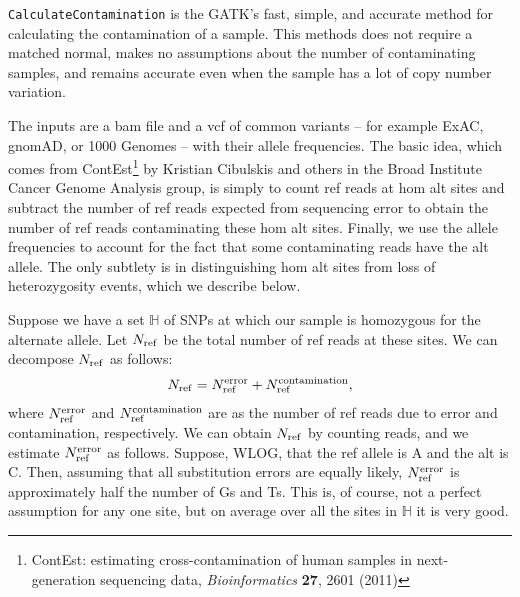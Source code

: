 \documentclass[nofootinbib,amssymb,amsmath]{revtex4}
\newcommand{\code}[1]{\texttt{#1}}
\begin{document}
\code{CalculateContamination} is the GATK's fast, simple, and accurate method for calculating the contamination of a sample.  This methods does not require a matched normal, makes no assumptions about the number of contaminating samples, and remains accurate even when the sample has a lot of copy number variation.

The inputs are a bam file and a vcf of common variants -- for example ExAC, gnomAD, or 1000 Genomes -- with their allele frequencies.  The basic idea, which comes from ContEst\footnote{ContEst: estimating cross-contamination of human samples in next-generation sequencing data, \textit{Bioinformatics} \textbf{27}, 2601 (2011)} by Kristian Cibulskis and others in the Broad Institute Cancer Genome Analysis group, is simply to count ref reads at hom alt sites and subtract the number of ref reads expected from sequencing error to obtain the number of ref reads contaminating these hom alt sites.  Finally, we use the allele frequencies to account for the fact that some contaminating reads have the alt allele.  The only subtlety is in distinguishing hom alt sites from loss of heterozygosity events, which we describe below.

Suppose we have a set $\mathbb{H}$ of SNPs at which our sample is homozygous for the alternate allele.  Let $N_{\rm ref}$ be the total number of ref reads at these sites.  We can decompose $N_{\rm ref}$ as follows:
\begin{align}
N_{\rm ref} = N_{\rm ref}^{\rm error} + N_{\rm ref}^{\rm contamination}, \label{decomposition}
\end{align}
where $N_{\rm ref}^{\rm error}$  and $N_{\rm ref}^{\rm contamination}$ are as the number of ref reads due to error and contamination, respectively.  We can obtain $N_{\rm ref}$ by counting reads, and we estimate $N_{\rm ref}^{\rm error}$ as follows.  Suppose, WLOG, that the ref allele is A and the alt is C.  Then, assuming that all substitution errors are equally likely, $N_{\rm ref}^{\rm error}$ is approximately half the number of Gs and Ts.  This is, of course, not a perfect assumption for any one site, but on average over all the sites in $\mathbb{H}$ it is very good.
\end{document}
